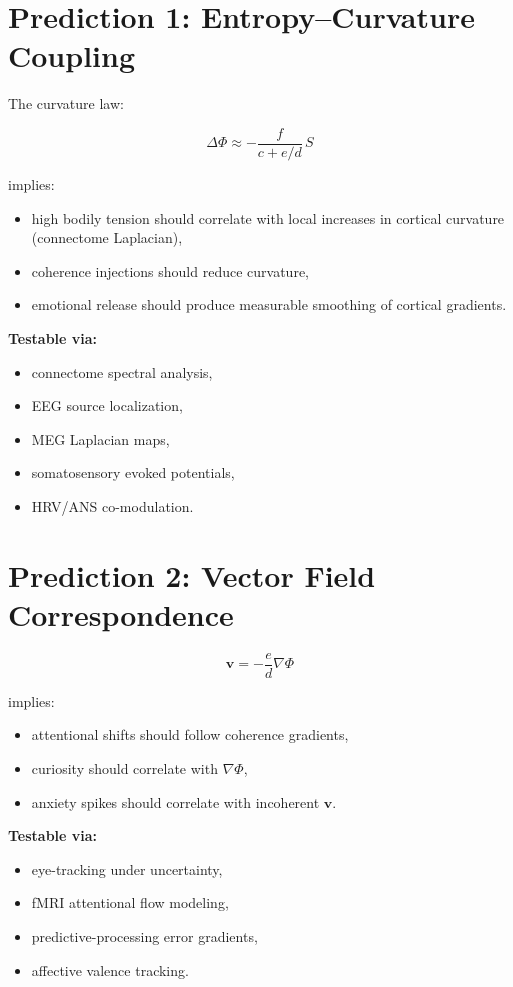 \documentclass[12pt]{article}
\begin{document}
\section{Prediction 1: Entropy–Curvature Coupling}

The curvature law:

\[
\Delta \Phi \approx -\frac{f}{c + e/d}\, S
\]

implies:

\begin{itemize}
\item high bodily tension should correlate with local increases in cortical curvature (connectome Laplacian),
\item coherence injections should reduce curvature,
\item emotional release should produce measurable smoothing of cortical gradients.
\end{itemize}


\textbf{Testable via:}

\begin{itemize}
    \item connectome spectral analysis,
    \item EEG source localization,
    \item MEG Laplacian maps,
    \item somatosensory evoked potentials,
    \item HRV/ANS co-modulation.
\end{itemize}

\section{Prediction 2: Vector Field Correspondence}

\[
\mathbf{v} = -\frac{e}{d}\nabla\Phi
\]

implies:

\begin{itemize}
    \item attentional shifts should follow coherence gradients,
    \item curiosity should correlate with $\nabla\Phi$,
    \item anxiety spikes should correlate with incoherent $\mathbf{v}$.
\end{itemize}

\textbf{Testable via:}

\begin{itemize}
    \item eye-tracking under uncertainty,
    \item fMRI attentional flow modeling,
    \item predictive-processing error gradients,
    \item affective valence tracking.
\end{itemize}
\end{document}
